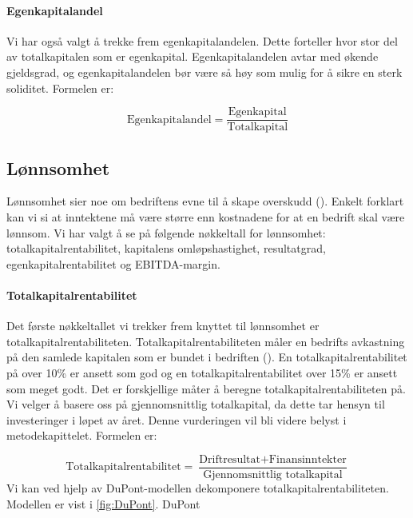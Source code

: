 \paragraph{Egenkapitalandel}
Vi har også valgt å trekke frem egenkapitalandelen. Dette forteller hvor stor del av totalkapitalen som er egenkapital. Egenkapitalandelen avtar med økende gjeldsgrad, og egenkapitalandelen bør være så høy som mulig for å sikre en sterk soliditet. Formelen er:

\begin{equation}
    \label{eq:egenkapitalandel}
    \boxed{\text{Egenkapitalandel}=\frac{\text{Egenkapital}}{\text{Totalkapital}}}
\end{equation}

\subsection{Lønnsomhet}

\label{sec:teori:lønnsomhet}
Lønnsomhet sier noe om bedriftens evne til å skape overskudd (\cite{kristoffersen}). Enkelt forklart kan vi si at inntektene må være større enn kostnadene for at en bedrift skal være lønnsom. Vi har valgt å se på følgende nøkkeltall for lønnsomhet: totalkapitalrentabilitet, kapitalens omløpshastighet, resultatgrad, egenkapitalrentabilitet og EBITDA-margin.

\paragraph{Totalkapitalrentabilitet}
Det første nøkkeltallet vi trekker frem knyttet til lønnsomhet er totalkapitalrentabiliteten. Totalkapitalrentabiliteten måler en bedrifts avkastning på den samlede kapitalen som er bundet i bedriften (\cite{kristoffersen}). En totalkapitalrentabilitet på over 10\% er ansett som god og en totalkapitalrentabilitet over 15\% er ansett som meget godt. 
Det er forskjellige måter å beregne totalkapitalrentabiliteten på. Vi velger å basere oss på gjennomsnittlig totalkapital, da dette tar hensyn til investeringer i løpet av året. Denne vurderingen vil bli videre belyst i metodekapittelet.
Formelen er:

\begin{equation}
    \label{eq:ROI}
    \boxed{\text{Totalkapitalrentabilitet}=\frac{\text{Driftresultat}+\text{Finansinntekter}}{\text{Gjennomsnittlig totalkapital}}}
\end{equation}
Vi kan ved hjelp av DuPont-modellen dekomponere totalkapitalrentabiliteten. Modellen er vist i \autoref{fig:DuPont}.
{DuPont}



